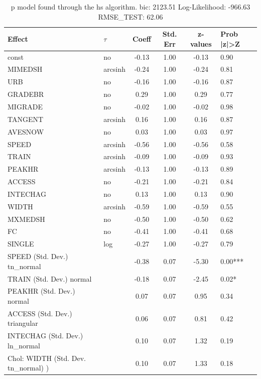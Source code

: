 \begin{table}
	\caption{p model found through the hs algorithm. bic: 2123.51 Log-Likelihood: -966.63 RMSE_TEST: 62.06}
	\begin{center}
		\begin{tabular}{|l|l|c|c|c|l|}
			\hline
			Effect & $\tau$ & Coeff & Std. Err & z-values & Prob |z|>Z \\
			\hline
			const & no & -0.13 & 1.00 & -0.13 & 0.90 \\
			\hline
			MIMEDSH & arcsinh & -0.24 & 1.00 & -0.24 & 0.81 \\
			\hline
			URB & no & -0.16 & 1.00 & -0.16 & 0.87 \\
			\hline
			GRADEBR & no & 0.29 & 1.00 & 0.29 & 0.77 \\
			\hline
			MIGRADE & no & -0.02 & 1.00 & -0.02 & 0.98 \\
			\hline
			TANGENT & arcsinh & 0.16 & 1.00 & 0.16 & 0.87 \\
			\hline
			AVESNOW & no & 0.03 & 1.00 & 0.03 & 0.97 \\
			\hline
			SPEED & arcsinh & -0.56 & 1.00 & -0.56 & 0.58 \\
			\hline
			TRAIN & arcsinh & -0.09 & 1.00 & -0.09 & 0.93 \\
			\hline
			PEAKHR & arcsinh & -0.13 & 1.00 & -0.13 & 0.89 \\
			\hline
			ACCESS & no & -0.21 & 1.00 & -0.21 & 0.84 \\
			\hline
			INTECHAG & no & 0.13 & 1.00 & 0.13 & 0.90 \\
			\hline
			WIDTH & arcsinh & -0.59 & 1.00 & -0.59 & 0.55 \\
			\hline
			MXMEDSH & no & -0.50 & 1.00 & -0.50 & 0.62 \\
			\hline
			FC & no & -0.41 & 1.00 & -0.41 & 0.68 \\
			\hline
			SINGLE & log & -0.27 & 1.00 & -0.27 & 0.79 \\
			\hline
			SPEED (Std. Dev.) tn_normal &  & -0.38 & 0.07 & -5.30 & 0.00*** \\
			\hline
			TRAIN (Std. Dev.) normal &  & -0.18 & 0.07 & -2.45 & 0.02* \\
			\hline
			PEAKHR (Std. Dev.) normal &  & 0.07 & 0.07 & 0.95 & 0.34 \\
			\hline
			ACCESS (Std. Dev.) triangular &  & 0.06 & 0.07 & 0.81 & 0.42 \\
			\hline
			INTECHAG (Std. Dev.) ln_normal &  & 0.10 & 0.07 & 1.32 & 0.19 \\
			\hline
			 Chol: WIDTH (Std. Dev. tn_normal) ) &  & 0.10 & 0.07 & 1.33 & 0.18 \\

\end{tabular}
\end{center}
\end{table}
